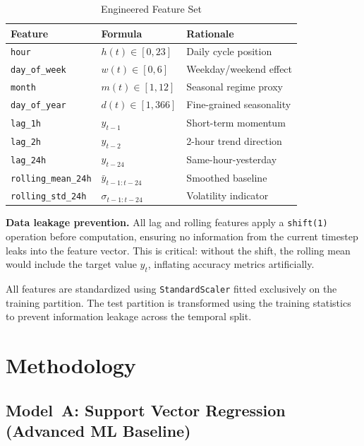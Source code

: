 \documentclass[conference, 10pt]{IEEEtran}
\begin{document}
\begin{table}[H]
\centering
\caption{Engineered Feature Set}
\label{tab:features}
\begin{tabular}{@{}lll@{}}
\toprule
\textbf{Feature} & \textbf{Formula} & \textbf{Rationale} \\
\midrule
\texttt{hour} & $h(t) \in [0, 23]$ & Daily cycle position \\
\texttt{day\_of\_week} & $w(t) \in [0, 6]$ & Weekday/weekend effect \\
\texttt{month} & $m(t) \in [1, 12]$ & Seasonal regime proxy \\
\texttt{day\_of\_year} & $d(t) \in [1, 366]$ & Fine-grained seasonality \\
\texttt{lag\_1h} & $y_{t-1}$ & Short-term momentum \\
\texttt{lag\_2h} & $y_{t-2}$ & 2-hour trend direction \\
\texttt{lag\_24h} & $y_{t-24}$ & Same-hour-yesterday \\
\texttt{rolling\_mean\_24h} & $\bar{y}_{t-1:t-24}$ & Smoothed baseline \\
\texttt{rolling\_std\_24h} & $\sigma_{t-1:t-24}$ & Volatility indicator \\
\bottomrule
\end{tabular}
\end{table}

\textbf{Data leakage prevention.} All lag and rolling features apply a \texttt{shift(1)} operation before computation, ensuring no information from the current timestep leaks into the feature vector. This is critical: without the shift, the rolling mean would include the target value $y_t$, inflating accuracy metrics artificially.

All features are standardized using \texttt{StandardScaler} fitted exclusively on the training partition. The test partition is transformed using the training statistics to prevent information leakage across the temporal split.

\section{Methodology}

\subsection{Model~A: Support Vector Regression (Advanced ML Baseline)}
\end{document}
